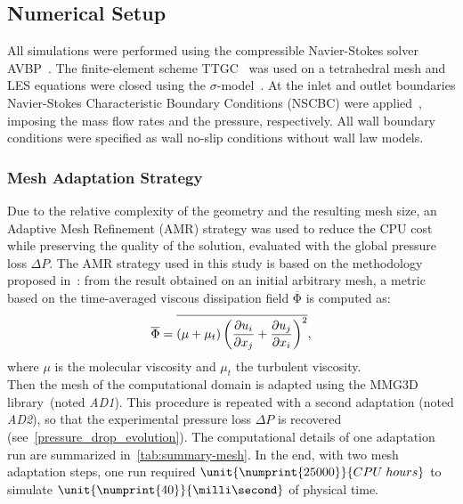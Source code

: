\subsection{Numerical Setup} \label{sec:num_setup}

All simulations were performed using the compressible Navier-Stokes solver AVBP~\cite{sch1999steady}. The finite-element scheme TTGC~\cite{colin_JCP_2000} was used on a tetrahedral mesh and LES equations were closed using the $\sigma$-model~\cite{nicoud_PoF_23_2011}. At the inlet and outlet boundaries Navier-Stokes Characteristic Boundary Conditions (NSCBC) were applied~\cite{poinsot1992boundary}, imposing the mass flow rates and the pressure, respectively. All wall boundary conditions were specified as wall no-slip conditions without wall law models.

\subsubsection{Mesh Adaptation Strategy}
Due to the relative complexity of the geometry and the resulting mesh size, an Adaptive Mesh Refinement (AMR) strategy was used to reduce the CPU cost while preserving the quality of the solution, evaluated with the global pressure loss $\Delta P$. The AMR strategy used in this study is based on the methodology proposed in~\cite{Daviller2017}: from the result obtained on an initial arbitrary mesh, a metric based on the time-averaged viscous dissipation field $\mathrm{\overline{\Phi}}$ is computed as: 
\begin{equation}\label{eq:phi}
\mathrm{\overline{\Phi}} = \overline {( \mu + \mu_t) \left(\frac{\partial{u_i}}{\partial{x_j}} + \frac{\partial{u_j}}{\partial{x_i}}\right)^2 },
\end{equation}
where $\mu$ is the molecular viscosity and $\mu_t$ the turbulent viscosity.\\
Then the mesh of the computational domain is adapted using the MMG3D library~\cite{Dapogny2014358}(noted \emph{AD1}). This procedure is repeated with a second adaptation (noted \emph{AD2}), so that the experimental pressure loss $\Delta P$ is recovered (see~\cref{pressure_drop_evolution}). The computational details of one adaptation run are summarized in~\cref{tab:summary-mesh}. In the end, with two mesh adaptation steps, one run required $\unit{\numprint{25000}}{CPU\;hours}$ to simulate $\unit{\numprint{40}}{\milli\second}$ of physical time.

